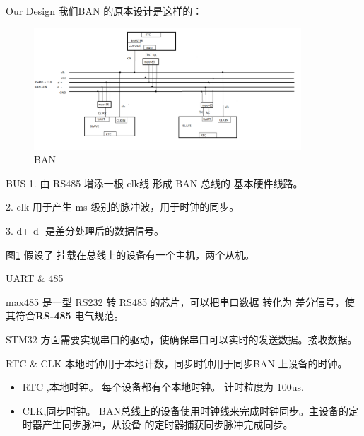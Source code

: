 \begin{frame}[fragile]{Our Design}
我们BAN 的原本设计是这样的：
\begin{figure}[htbp]
\begin{center}
\includegraphics[width=10cm]{img/overview}
\caption{BAN }
\label{Overview}
\end{center}
\vspace{-0.5em}
\end{figure}
\end{frame}





\begin{frame}[fragile]{BUS}
1. 由 RS485 增添一根 clk线 形成 BAN 总线的 基本硬件线路。

2. clk 用于产生 ms 级别的脉冲波，用于时钟的同步。

3.  d+ d- 是差分处理后的数据信号。

图\ref{Overview} 假设了 挂载在总线上的设备有一个主机，两个从机。

\end{frame}

\begin{frame}[fragile]{UART \& 485}

max485 是一型 RS232 转 RS485 的芯片，可以把串口数据 转化为 差分信号，使其符合\textbf{RS-485}
电气规范。

STM32 方面需要实现串口的驱动，使确保串口可以实时的发送数据。接收数据。

\end{frame}

\begin{frame}[fragile]{RTC \& CLK}
本地时钟用于本地计数，同步时钟用于同步BAN 上设备的时钟。
\begin{itemize}
\item  RTC ,本地时钟。 每个设备都有个本地时钟。 计时粒度为 100us.

\item  CLK,同步时钟。 BAN总线上的设备使用时钟线来完成时钟同步。主设备的定时器产生同步脉冲，从设备
的定时器捕获同步脉冲完成同步。
\end{itemize}


\end{frame}



